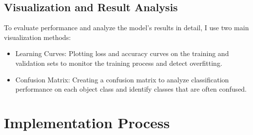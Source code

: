 \documentclass[12pt, a4paper, openany]{report}
\begin{document}
 \section{Visualization and Result Analysis} %
 To evaluate performance and analyze the model's results in detail, I use two main visualization methods:
 \begin{itemize}
     \item Learning Curves: Plotting loss and accuracy curves on the training and validation sets to monitor the training process and detect overfitting. %
     \item Confusion Matrix: Creating a confusion matrix to analyze classification performance on each object class and identify classes that are often confused. %
 \end{itemize}

 \chapter{Implementation Process} %
\end{document}
